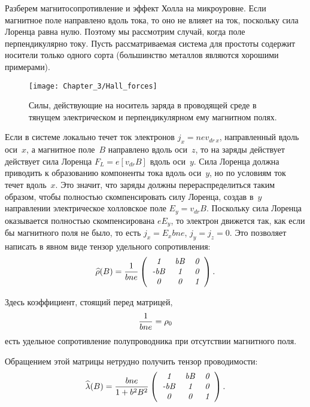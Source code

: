 Разберем магнитосопротивление и эффект Холла на микроуровне. Если магнитное поле
направлено вдоль тока, то
оно не влияет на ток, поскольку сила Лоренца равна нулю. Поэтому мы рассмотрим
случай, когда поле перпендикулярно
току. Пусть рассматриваемая система для простоты содержит носители только одного
сорта (большинство металлов
являются хорошими примерами).
\begin{figure}[h!]
	\texttt{[image: Chapter\_3/Hall\_forces]}
	\caption{Силы, действующие на носитель заряда в проводящей среде в тянущем
электрическом и перпендикулярном ему магнитном полях.}
\end{figure}

Если в системе локально течет ток электронов $j_x=nev_{dr\, x}$, направленный
вдоль оси~$x$, а магнитное поле~$B$ направлено вдоль оси~$z$, то на заряды
действует действует сила Лоренца $ F_{L}=e[v_{dr}B]$ вдоль оси~$y$.
Сила Лоренца должна приводить к образованию компоненты тока вдоль оси~$y$, но по
условиям ток течет вдоль~$x$. Это значит, что заряды должны перераспределиться
таким образом, чтобы полностью скомпенсировать силу
Лоренца, создав в~$y$ направлении электрическое холловское поле $E_y=v_{dr}B$.
Поскольку сила Лоренца
оказывается полностью скомпенсирована $eE_y$, то электрон движется так, как если
бы магнитного поля не
было, то есть $j_x=E_xbne$, $j_y=j_z=0$. Это позволяет написать в явном виде
тензор удельного сопротивления:
\begin{equation}
	\widehat{\rho}(B)=\frac{1}{bne}\left(
	\begin{tabular}{ccc}
		{\it 1} & {\it bB} & {\it 0} \\
		{\it -bB} &{\it 1}& {\it 0} \\
		{\it 0} &{\it 0}& {\it 1}\\
	\end{tabular}
	\right).
	\eqmark{3.17}
\end{equation}

Здесь коэффициент, стоящий перед матрицей,
\begin{equation}
	\frac{1}{bne} = \rho_0
	\eqmark{UdSoprot}
\end{equation}
есть удельное сопротивление полупроводника при отсутствии магнитного поля.

Обращением этой матрицы нетрудно получить тензор проводимости:
\begin{equation}
	\widehat{\lambda}(B)=\frac{bne}{1+b^2B^2}\left(
	\begin{tabular}{ccc}
		{\it 1} & {\it bB} & {\it 0} \\
		{\it -bB} &{\it 1}& {\it 0} \\
		{\it 0} &{\it 0}& {\it 1}\\
	\end{tabular}
	\right).
	\eqmark{3.18}
\end{equation}

